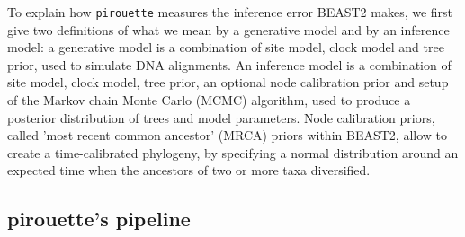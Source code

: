 \documentclass{article}
\begin{document}
To explain how \verb;pirouette; measures the inference error
BEAST2 makes, we first give two definitions of what
we mean by a generative model and by an inference model: 
a generative model is a combination of site model, clock model and tree prior,
used to simulate DNA alignments. An inference model is a combination of 
site model, clock model, tree prior, an optional node calibration prior
and setup of the Markov chain Monte Carlo (MCMC) algorithm, 
used to produce a posterior distribution of trees and model parameters. Node calibration priors, called 'most
recent common ancestor' (MRCA) priors within BEAST2, allow to create a time-calibrated phylogeny, by specifying a normal distribution around an expected time when the ancestors of two or more taxa diversified. 

\subsection{pirouette's pipeline}
\end{document}

